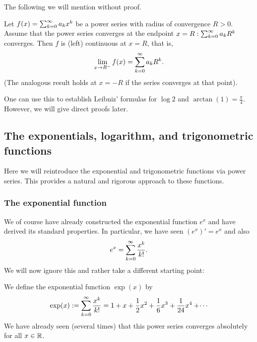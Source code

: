 \documentclass[10pt, a4paper]{article}
\newcommand{\infsumo}{\infsum[k = 0]}
\begin{document}
The following we will mention without proof.
\begin{theorem}\label{pre:analy:thm:abellimthm}
    Let $f(x) = \infsumo a_kx ^ k$ be a power series with radius of convergence $R > 0$.
    Assume that the power series converges at the endpoint $x = R: \infsumo a_kR ^ k$ converges.
    Then $f$ is
    (left)
    continuous at $x = R$,
    that is,
    \[
    \lim_{x \rightarrow R ^ {-}}f(x) = \infsumo a_kR ^ k.
    \]
    (The analogous result holds at $x = -R$ if the series converges at that point).
\end{theorem}

One can use this to establish Leibniz' formulas for $\log{2}$ and $\arctan(1) = \frac{\pi}{4}$.
However,
we will give direct proofs later.

\subsection{The exponentials, logarithm, and trigonometric functions}
Here we will reintroduce the exponential and trigonometric functions via power series.
This provides a natural and rigorous approach to these functions.

\subsubsection{The exponential function}
We of course have already constructed the exponential function $e ^ x$ and have derived its standard properties.
In particular,
we have seen $(e ^ x)' = e ^ x$ and also
\[
e ^ x = \infsumo\frac{x ^ k}{k!}.
\]
We will now ignore this and rather take a different starting point:
\begin{definition}
    We define the exponential function $\exp(x)$ by
    \[
    \exp(x) := \infsumo\frac{x ^ k}{k!} = 1 + x + \frac{1}{2}x ^ 2 + \frac{1}{6}x ^ 3 + \frac{1}{24}x ^ 4 + \dotsi
    \]
    We have already seen
    (several times)
    that this power series converges absolutely for all $x \in \mathbb{R}$.
\end{definition}
\end{document}
